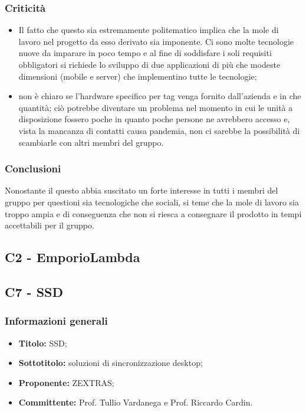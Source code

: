 \documentclass[]{article}
\begin{document}
			\subsubsection{Criticità}
			\begin{itemize}
				\item Il fatto che questo  sia estremamente politematico implica che la mole di lavoro nel progetto da esso derivato sia imponente. Ci sono molte tecnologie nuove da imparare in poco tempo e al fine di soddisfare i soli requisiti obbligatori si richiede lo sviluppo di due applicazioni di più che modeste dimensioni (mobile e server) che implementino tutte le tecnologie;
				\item non è chiaro se l'hardware specifico per tag  venga fornito dall'azienda e in che quantità; ciò potrebbe diventare un problema nel momento in cui le unità a disposizione fossero poche in quanto poche persone ne avrebbero accesso e, vista la mancanza di contatti causa pandemia, non ci sarebbe la possibilità di scambiarle con altri membri del gruppo.
			\end{itemize}

			\subsubsection{Conclusioni}
			Nonostante il questo  abbia suscitato un forte interesse in tutti i membri del gruppo per questioni sia tecnologiche che sociali, si teme che la mole di lavoro sia troppo ampia e di conseguenza che non si riesca a consegnare il prodotto in tempi accettabili per il gruppo.

		\newpage

		\subsection{C2 - EmporioLambda}
		
		
		\subsection{C7 - SSD}
		\subsubsection{Informazioni generali}
		\begin{itemize}
			\item \textbf{Titolo:} SSD;
			\item \textbf{Sottotitolo:} soluzioni di sincronizzazione desktop;
			\item \textbf{Proponente:} ZEXTRAS;
			\item \textbf{Committente:} Prof. Tullio Vardanega e Prof. Riccardo Cardin.
		\end{itemize}
		
\end{document}
